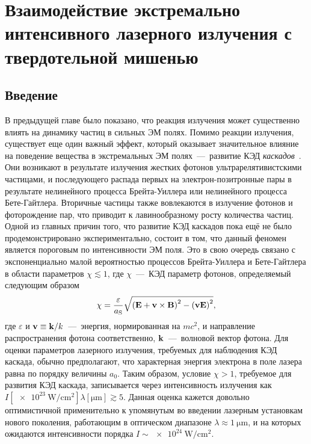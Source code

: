 \chapter{Взаимодействие экстремально интенсивного лазерного излучения с твердотельной мишенью}\label{ch:ch2}

\section{Введение}\label{sec:ch2/sec1}
В предыдущей главе было показано, что реакция излучения может существенно влиять на динамику частиц в сильных ЭМ полях.
Помимо реакции излучения, существует еще один важный эффект, который оказывает значительное влияние на поведение вещества в экстремальных ЭМ полях~---~развитие КЭД \textit{каскадов}~\cite{sturrock1971model,daugherty1982electromagnetic,nerush2007radiation,Bell2008,Nerush11a,Ridgers12,narozhny2015quantum,Kostyukov2016,nerush2017weibel,efimenko2019laser,yakimenko2019prospect}.
Они возникают в результате излучения жестких фотонов ультрарелятивистскими частицами, и последующего распада первых на электрон-позитронные пары в результате нелинейного процесса Брейта-Уиллера или нелинейного процесса Бете-Гайтлера.
Вторичные частицы также вовлекаются в излучение фотонов и фоторождение пар, что приводит к лавинообразному росту количества частиц.
Одной из главных причин того, что развитие КЭД каскадов пока ещё не было продемонстрировано экспериментально, состоит в том, что данный феномен является пороговым по интенсивности ЭМ поля.
Это в свою очередь связано с экспоненциально малой вероятностью процессов Брейта-Уиллера и Бете-Гайтлера в области параметров $\chi\lesssim 1$, где $\chi$~---~КЭД параметр фотонов, определяемый следующим образом
\begin{equation}
    \chi = \frac{\varepsilon}{a_\mathrm{S}} \sqrt{{\left( \vb{E} + \vb{v}\times\vb{B} \right)}^2 - {\left(\vb{v}\vb{E} \right)}^2} ,
\end{equation}
где $\varepsilon$ и $\vb{v}\equiv\vb{k}/k$~---~энергия, нормированная на $mc^2$, и направление распространения фотона соответственно, $\vb{k}$~---~волновой вектор фотона.
Для оценки параметров лазерного излучения, требуемых для наблюдения КЭД каскада, обычно предполагают, что характерная энергия электрона в поле лазера равна по порядку величины $a_0$.
Таким образом, условие $\chi>1$, требуемое для развития КЭД каскада, записывается через интенсивность излучения как $I[\SI{e23}{\watt/\centi\meter^2}]\lambda[\si{\um}]\gtrsim 5$.
Данная оценка кажется довольно оптимистичной применительно к упомянутым во введении лазерным установкам нового поколения, работающим в оптическом диапазоне $\lambda\approx\SI{1}{\um}$, и на которых ожидаются интенсивности порядка ${I\sim\SI{e24}{\watt/\centi\meter^2}}$.
